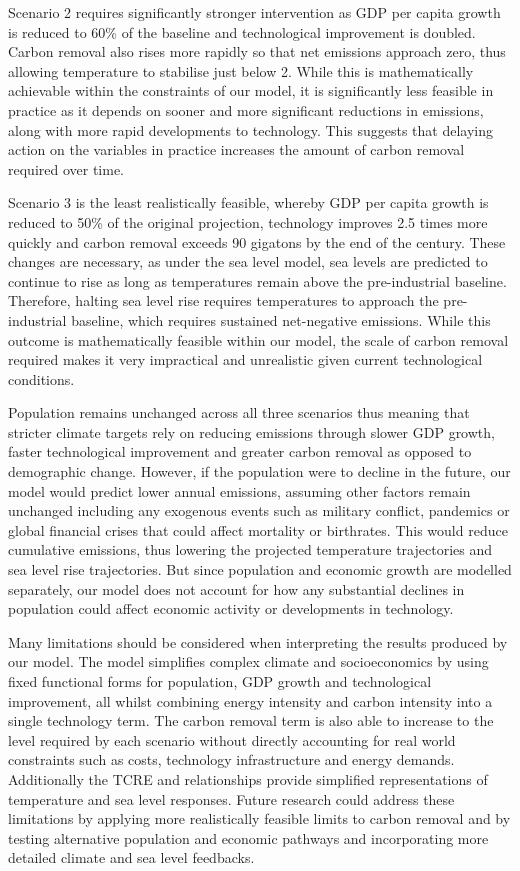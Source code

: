 \documentclass[12pt]{article}
\begin{document}
Scenario 2 requires significantly stronger intervention as GDP per capita growth is reduced to 60\% of the baseline
and technological improvement is doubled.
Carbon removal also rises more rapidly so that net emissions approach zero,
thus allowing temperature to stabilise just below 2.
While this is mathematically achievable within the constraints of our model,
it is significantly less feasible in practice as it depends on sooner and more significant reductions in emissions,
along with more rapid developments to technology.
This suggests that delaying action on the variables in practice increases the amount of carbon removal required over time.

Scenario 3 is the least realistically feasible,
whereby GDP per capita growth is reduced to 50\% of the original projection,
technology improves 2.5 times more quickly and carbon removal exceeds 90 gigatons by the end of the century.
These changes are necessary, as under the \citeauthor{rahmstorf_2007} sea level model,
sea levels are predicted to continue to rise as long as temperatures remain above the pre-industrial baseline.
Therefore, halting sea level rise requires temperatures to approach the pre-industrial baseline,
which requires sustained net-negative emissions.
While this outcome is mathematically feasible within our model,
the scale of carbon removal required makes it very impractical and unrealistic given current technological conditions.

Population remains unchanged across all three scenarios thus meaning that stricter climate targets rely on reducing emissions
through slower GDP growth, faster technological improvement and greater carbon removal as opposed to demographic change.
However, if the population were to decline in the future, our model would predict lower annual emissions,
assuming other factors remain unchanged including any exogenous events such as military conflict, pandemics or global financial crises
that could affect mortality or birthrates.
This would reduce cumulative emissions, thus lowering the projected temperature trajectories and sea level rise trajectories.
But since population and economic growth are modelled separately,
our model does not account for how any substantial declines in population could affect economic activity or developments in technology.

Many limitations should be considered when interpreting the results produced by our model.
The model simplifies complex climate and socioeconomics by using fixed functional forms for population,
GDP growth and technological improvement, all whilst combining energy intensity and carbon intensity into a single technology term.
The carbon removal term is also able to increase to the level required by each scenario without directly accounting
for real world constraints such as costs, technology infrastructure and energy demands.
Additionally the TCRE and \citeauthor{rahmstorf_2007} relationships provide simplified representations of temperature and sea level responses.
Future research could address these limitations by applying more realistically feasible limits to carbon removal
and by testing alternative population and economic pathways and incorporating more detailed climate and sea level feedbacks.
\end{document}

